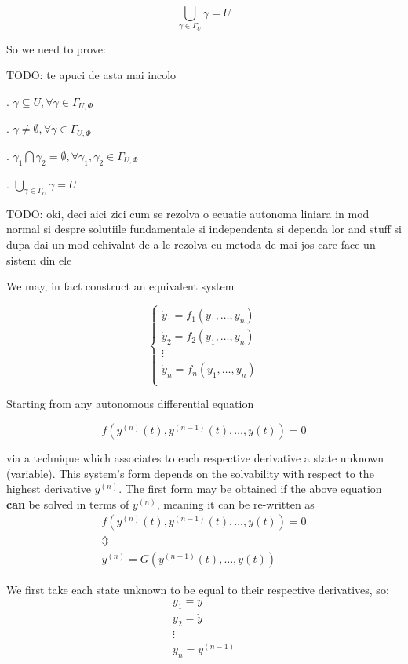 \[
  \bigcup_{\gamma\in \Gamma_U} \gamma = U
\]

So we need to prove:

TODO: te apuci de asta mai incolo \par
{}. $\gamma \subseteq U, \forall \gamma \in \Gamma_{U,\Phi}$ \par
{}. $ \gamma \neq \emptyset, \forall \gamma \in \Gamma_{U,\Phi}$ \par
{}. $\gamma_1 \bigcap \gamma_2 = \emptyset, \forall \gamma_1, \gamma_2 \in \Gamma_{U,\Phi}$ \par
{}. $\bigcup_{\gamma\in \Gamma_U} \gamma = U$ \par

TODO: oki, deci aici zici cum se rezolva o ecuatie autonoma liniara in mod normal si despre solutiile fundamentale si independenta si dependa lor and stuff si dupa dai un mod echivalnt de a le rezolva cu metoda de mai jos care face un sistem din ele

We may, in fact construct an equivalent system

\[
  \begin{cases}
    \dot{y}_1 = f_1(y_1,\dots, y_n) \\
    \dot{y}_2 = f_2(y_1,\dots, y_n) \\
    \vdots                          \\
    \dot{y}_n = f_n(y_1,\dots, y_n) \\
  \end{cases}
\]

Starting from any autonomous differential equation

\[
  f(y^{(n)}(t), y^{(n-1)}(t), \dots, y(t))= 0
\]

via a technique which associates to each respective derivative a state unknown (variable).
This system's form depends on the solvability with respect to the highest derivative $y^{(n)}$.
The first form may be obtained if the above equation \textbf{can} be solved in terms of $y^{(n)}$, meaning it can be re-written as
\begin{gather*}
  f(y^{(n)}(t), y^{(n-1)}(t), \dots, y(t))= 0 \\
  \Updownarrow \\
  y^{(n)}  = G(y^{(n-1)}(t), \dots, y(t))
\end{gather*}

We first take each state unknown to be equal to their respective derivatives, so:
\begin{gather*}
  y_1 = y     \\
  y_2 = \dot{y} \\
  \vdots \\
  y_n = y^{(n-1)}
\end{gather*}

